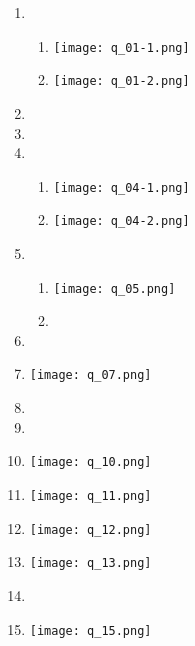 \begin{enumerate}

	\item \begin{enumerate}
			\item \texttt{[image: q\_01-1.png]}

			\item \texttt{[image: q\_01-2.png]}
	\end{enumerate}

\item 

\item 

\item \begin{enumerate}
		\item \texttt{[image: q\_04-1.png]}

		\item \texttt{[image: q\_04-2.png]}
\end{enumerate}

\item \begin{enumerate}
		\item \texttt{[image: q\_05.png]}

		\item 
\end{enumerate}

\item 

\item \texttt{[image: q\_07.png]}

\item 

\item 

\item \texttt{[image: q\_10.png]}

\item \texttt{[image: q\_11.png]}

\item \texttt{[image: q\_12.png]}

\item \texttt{[image: q\_13.png]}

\item 

\item \texttt{[image: q\_15.png]}


\end{enumerate}
